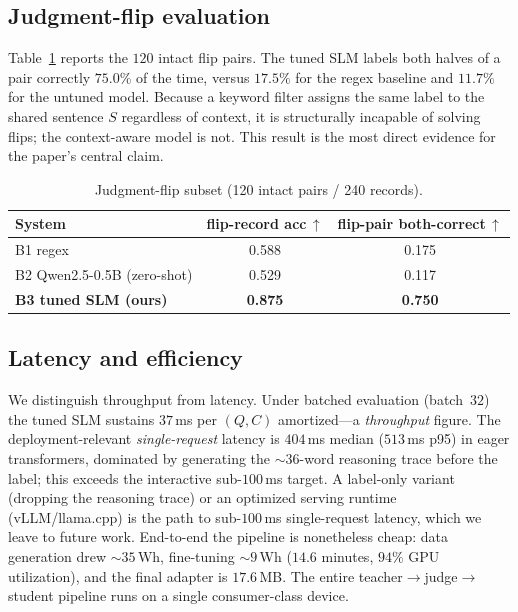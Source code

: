 \documentclass[11pt]{article}
\begin{document}
\subsection{Judgment-flip evaluation}
Table~\ref{tab:flip} reports the $120$ intact flip pairs. The tuned SLM labels both
halves of a pair correctly $75.0\%$ of the time, versus $17.5\%$ for the regex
baseline and $11.7\%$ for the untuned model. Because a keyword filter assigns the same
label to the shared sentence $S$ regardless of context, it is structurally incapable
of solving flips; the context-aware model is not. This result is the most direct
evidence for the paper's central claim.

\begin{table}[t]
\centering
\caption{Judgment-flip subset (120 intact pairs / 240 records).}
\label{tab:flip}
\begin{tabular}{lcc}
\toprule
System & flip-record acc\,$\uparrow$ & flip-pair both-correct\,$\uparrow$ \\
\midrule
B1 regex                     & 0.588 & 0.175 \\
B2 Qwen2.5-0.5B (zero-shot)  & 0.529 & 0.117 \\
\textbf{B3 tuned SLM (ours)} & \textbf{0.875} & \textbf{0.750} \\
\bottomrule
\end{tabular}
\end{table}

\subsection{Latency and efficiency}
\label{sec:latency}
We distinguish throughput from latency. Under batched evaluation (batch~$32$) the tuned
SLM sustains $37$\,ms per $(Q,C)$ amortized---a \emph{throughput} figure. The
deployment-relevant \emph{single-request} latency is $404$\,ms median ($513$\,ms p95)
in eager transformers, dominated by generating the ${\sim}36$-word reasoning trace
before the label; this exceeds the interactive sub-$100$\,ms target. A label-only
variant (dropping the reasoning trace) or an optimized serving runtime
(vLLM/llama.cpp) is the path to sub-$100$\,ms single-request latency, which we leave to
future work. End-to-end the pipeline is nonetheless cheap: data generation drew
$\sim$$35$\,Wh, fine-tuning $\sim$$9$\,Wh ($14.6$ minutes, $94\%$ GPU utilization), and
the final adapter is $17.6$\,MB. The entire teacher$\rightarrow$judge$\rightarrow$%
student pipeline runs on a single consumer-class device.
\end{document}
